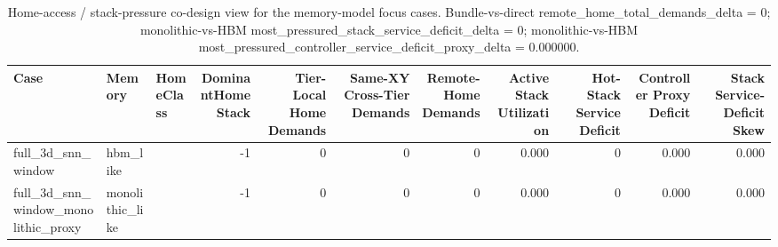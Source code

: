 \begin{table}[t]
  \centering
  \caption{Home-access / stack-pressure co-design view for the memory-model focus cases. Bundle-vs-direct remote\_home\_total\_demands\_delta = 0; monolithic-vs-HBM most\_pressured\_stack\_service\_deficit\_delta = 0; monolithic-vs-HBM most\_pressured\_controller\_service\_deficit\_proxy\_delta = 0.000000.}
  \begin{tabular}{l l l r r r r r r r r}
  \hline
  Case & Memory & HomeClass & DominantHomeStack & Tier-Local Home Demands & Same-XY Cross-Tier Demands & Remote-Home Demands & Active Stack Utilization & Hot-Stack Service Deficit & Controller Proxy Deficit & Stack Service-Deficit Skew \\
  \hline
  full\_3d\_snn\_window & hbm\_like &  & -1 & 0 & 0 & 0 & 0.000 & 0 & 0.000 & 0.000 \\
  full\_3d\_snn\_window\_monolithic\_proxy & monolithic\_like &  & -1 & 0 & 0 & 0 & 0.000 & 0 & 0.000 & 0.000 \\
  \hline
  \end{tabular}
\end{table}
